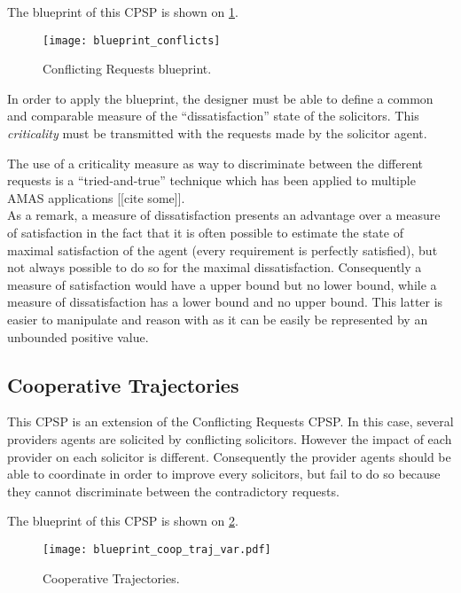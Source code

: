 The blueprint of this CPSP is shown on \figurename{} \ref{blueprint_conflicts}.

\begin{figure}
\centering
\texttt{[image: blueprint\_conflicts]}
\caption{Conflicting Requests blueprint.}\label{blueprint_conflicts}
\end{figure}

In order to apply the blueprint, the designer must be able to define a common and comparable measure of the \enquote{dissatisfaction} state of the solicitors. This \emph{criticality} must be transmitted with the requests made by the solicitor agent.

The use of a criticality measure as way to discriminate between the different requests is a \enquote{tried-and-true} technique which has been applied to multiple AMAS applications [[cite some]].\\
As a remark, a measure of dissatisfaction presents an advantage over a measure of satisfaction in the fact that it is often possible to estimate the state of maximal satisfaction of the agent (every requirement is perfectly satisfied), but not always possible to do so for the maximal dissatisfaction. Consequently a measure of satisfaction would have a upper bound but no lower bound, while a measure of dissatisfaction has a lower bound and no upper bound. This latter is easier to manipulate and reason with as it can be easily be represented by an unbounded positive value.

\subsection{Cooperative Trajectories}

This CPSP is an extension of the Conflicting Requests CPSP. In this case, several providers agents are solicited by conflicting solicitors. However the impact of each provider on each solicitor is different. Consequently the provider agents should be able to coordinate in order to improve every solicitors, but fail to do so because they cannot discriminate between the contradictory requests.

The blueprint of this CPSP is shown on \figurename{} \ref{blueprint_coop_traj}.

\begin{figure}
\centering
\texttt{[image: blueprint\_coop\_traj\_var.pdf]}
\caption{Cooperative Trajectories.}\label{blueprint_coop_traj}
\end{figure}

